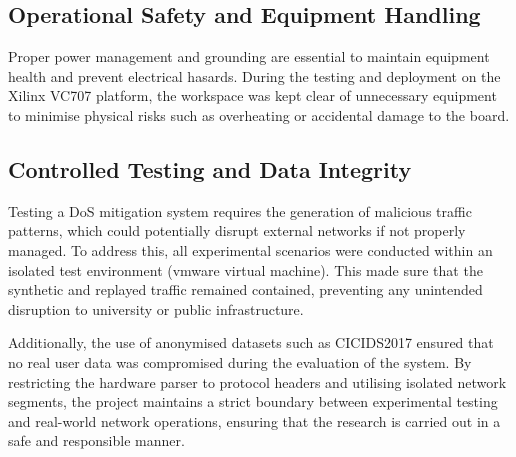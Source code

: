 \subsection{Operational Safety and Equipment Handling}
Proper power management and grounding are essential to maintain equipment health and prevent electrical hasards. During the testing and deployment on the Xilinx VC707 platform, the workspace was kept clear of unnecessary equipment to minimise physical risks such as overheating or accidental damage to the board.

\subsection{Controlled Testing and Data Integrity}
Testing a DoS mitigation system requires the generation of malicious traffic patterns, which could potentially disrupt external networks if not properly managed. To address this, all experimental scenarios were conducted within an isolated test environment (vmware virtual machine). This made sure that the synthetic and replayed traffic remained contained, preventing any unintended disruption to university or public infrastructure.

Additionally, the use of anonymised datasets such as CICIDS2017 ensured that no real user data was compromised during the evaluation of the system. By restricting the hardware parser to protocol headers and utilising isolated network segments, the project maintains a strict boundary between experimental testing and real-world network operations, ensuring that the research is carried out in a safe and responsible manner.